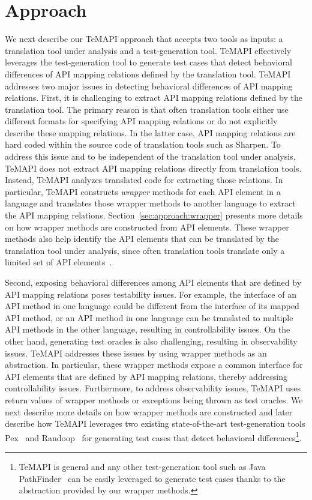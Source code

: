 \section{Approach}
\label{sec:approach}

We next describe our TeMAPI approach that accepts two tools as inputs: a translation tool under analysis and a test-generation tool. TeMAPI effectively leverages the test-generation tool to generate test cases that detect behavioral differences of API mapping relations defined by the translation tool. TeMAPI addresses two major issues in detecting behavioral differences of API mapping relations. First, it is challenging to extract API mapping relations defined by the translation tool. The primary reason is that often translation tools either use different formats for specifying API mapping relations or do not explicitly describe these mapping relations. In the latter case, API mapping relations are hard coded within the source code of translation tools such as Sharpen. To address this issue and to be independent of the translation tool under analysis, TeMAPI does not extract API mapping relations directly from translation tools. Instead, TeMAPI analyzes translated code for extracting those relations. In particular, TeMAPI constructs \emph{wrapper} methods for each API element in a language and translates those wrapper methods to another language to extract the API mapping relations. Section~\ref{sec:approach:wrapper} presents more details on how wrapper methods are constructed from API elements. These wrapper methods also help identify the API elements that can be translated by the translation tool under analysis, since often translation tools translate only a limited set of API elements~\citep{zhong2010mining}.

Second, exposing behavioral differences among API elements that are defined by API mapping relations poses testability issues. For example, the interface of an API method in one language could be different from the interface of its mapped API method, or an API method in one language can be translated to multiple API methods in the other language, resulting in controllability issues. On the other hand, generating test oracles is also challenging, resulting in observability issues. TeMAPI addresses these issues by using wrapper methods as an abstraction. In particular, these wrapper methods expose a common interface for API elements that are defined by API mapping relations, thereby addressing controllability issues. Furthermore, to address observability issues, TeMAPI uses return values of wrapper methods or exceptions being thrown as test oracles. We next describe more details on how wrapper methods are constructed and later describe how TeMAPI leverages two existing state-of-the-art test-generation tools Pex~\citep{tillmann2008pex} and Randoop~\citep{pacheco2007feedback} for generating test cases that detect behavioral differences\footnote{TeMAPI is general and any other test-generation tool such as Java PathFinder~\citep{DBLP:conf/tacas/AnandPV07} can be easily leveraged to generate test cases thanks to the abstraction provided by our wrapper methods.}.

